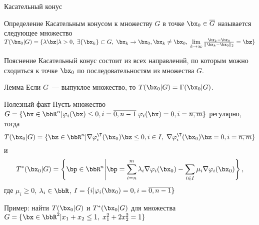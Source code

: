 \documentclass[12pt,russian]{beamer}
\begin{document}
\begin{frame}{Касательный конус}
\begin{block}{Определение}
Касательным конусом к множеству $G$ в точке $\bx_0 \in \overline{G}$ называется следующее множество $T(\bx_0 |G) = \{ \lambda \bz | \lambda > 0, \; \exists \{\bx_k\} \subset G, \; \bx_k \rightarrow \bx_0, \bx_k \neq \bx_0, \; \lim\limits_{k \rightarrow \infty} \frac{\bx_k - \bx_0}{\|\bx_k - \bx_0\|_2} = \bz \}$
\end{block}

\begin{block}{Пояснение}
Касательный конус состоит из всех направлений, по которым можно сходиться к точке $\bx_0$ по последовательностям из множества $G$.
\end{block}

\begin{block}{Лемма}
Если $G$~--- выпуклое множество, то $T(\bx_0|G) = \Gamma(\bx_0|G)$.
\end{block}
\end{frame}

\begin{frame}{Полезный факт}
Пусть множество $G = \{\bx \in \bbR^n | \varphi_i(\bx) \leq 0, i = \overline{0, n-1} \; \varphi_i(\bx) = 0, i = \overline{n, m} \}$ регулярно, тогда \vspace{-4mm}
\[
T(\bx_0|G) = \{ \bz \in \bbR^n | \nabla \varphi^{\T}_i(\bx_0)\bz \leq 0, i \in I, \; \nabla \varphi^{\T}_i(\bx_0)\bz = 0, i = \overline{n,m} \}
\vspace{-4mm}
\]
и \vspace{-4mm}
\[
T^*(\bx_0|G) = \left \{ \bp \in \bbR^n \middle| \bp = \sum\limits_{i = n}^m \lambda_i \nabla \varphi_i(\bx_0) - \sum\limits_{i \in I} \mu_i \nabla \varphi_i(\bx_0) \right \},
\] 
где $\mu_i \geq 0$, $\lambda_i \in \bbR$, $I = \{i | \varphi_i(\bx_0) = 0, i = \overline{0, n-1} \}$

Пример: найти $T(\bx_0|G)$ и $T^*(\bx_0|G)$ для множества $G = \{\bx \in \bbR^2 | x_1 + x_2 \leq 1, \; x^2_1 + 2x_2^2 = 1 \}$
\end{frame}
\end{document}
